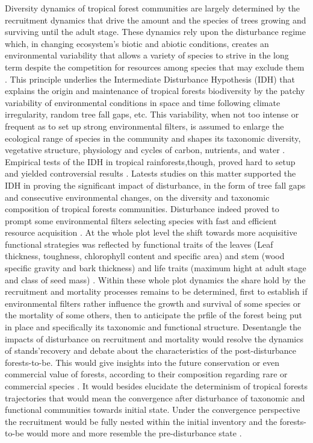 \documentclass[fleqn,10pt]{ArtEcoFoG} %
\begin{document}
Diversity dynamics of tropical forest communities are largely determined
by the recruitment dynamics that drive the amount and the species of
trees growing and surviving until the adult stage. These dynamics rely
upon the disturbance regime which, in changing ecosystem's biotic and
abiotic conditions, creates an environmental variability that allows a
variety of species to strive in the long term despite the competition
for resources among species that may exclude them \citep{Denslow1980}.
This principle underlies the Intermediate Disturbance Hypothesis (IDH)
that explains the origin and maintenance of tropical forests
biodiversity by the patchy variability of environmental conditions in
space and time following climate irregularity, random tree fall gaps,
etc. This variability, when not too intense or frequent as to set up
strong environmental filters, is assumed to enlarge the ecological range
of species in the community \citep{Molino2001, Bongers2009} and shapes
its taxonomic diversity, vegetative structure, physiology and cycles of
carbon, nutrients, and water \citep{Anderson-Teixeira2013}. Empirical
tests of the IDH in tropical rainforests,though, proved hard to setup
and yielded controversial results
\citep{Hubbell1999, Molino2001, Sheil2003}. Latests studies on this
matter supported the IDH in proving the significant impact of
disturbance, in the form of tree fall gaps and consecutive environmental
changes, on the diversity and taxonomic composition of tropical forests
communities. Disturbance indeed proved to prompt some environmental
filters selecting species with fast and efficient resource acquisition
\citep[Mirabel2018,in prep.]{Baraloto2012a}. At the whole plot level the
shift towards more acquisitive functional strategies was reflected by
functional traits of the leaves (Leaf thickness, toughness, chlorophyll
content and specific area) and stem (wood specific gravity and bark
thickness) and life traits (maximum hight at adult stage and class of
seed mass) \citep{Wright2004, Chave2009b, Herault2011}. Within these
whole plot dynamics the share hold by the recruitment and mortality
processes remains to be determined, first to establish if environmental
filters rather influence the growth and survival of some species or the
mortality of some others, then to anticipate the prfile of the forest
being put in place and specifically its taxonomic and functional
structure. Desentangle the impacts of disturbance on recruitment and
mortality would resolve the dynamics of stands'recovery and debate about
the characteristics of the post-disturbance forests-to-be. This would
give insights into the future conservation or even commercial value of
forests, according to their composition regarding rare or commercial
species \citep{Diaz2005, Gardner2007, Schwartz2017}. It would besides
elucidate the determinism of tropical forests trajectories that would
mean the convergence after disturbance of taxonomic and functional
communities towards initial state. Under the convergence perspective the
recruitment would be fully nested within the initial inventory and the
forests-to-be would more and more resemble the pre-disturbance state
\citep{Meiners2015, Li2016}.
\end{document}
